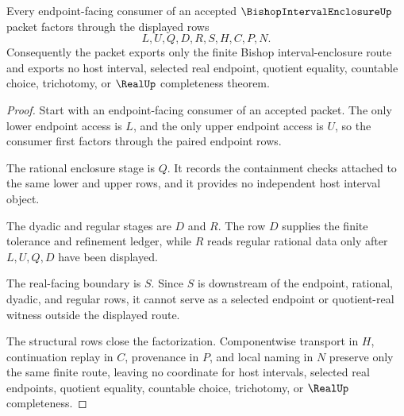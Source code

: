 \begin{theorem}
\label{thm:bishop-interval-enclosure-endpoint-nonescape}
Every endpoint-facing consumer of an accepted $\BishopIntervalEnclosureUp$ packet factors through the displayed rows
$$
L,U,Q,D,R,S,H,C,P,N .
$$
Consequently the packet exports only the finite Bishop interval-enclosure route and exports no host interval, selected real endpoint, quotient equality, countable choice, trichotomy, or $\RealUp$ completeness theorem.
\end{theorem}
\begin{proof}
Start with an endpoint-facing consumer of an accepted packet. The only lower endpoint access is $L$, and the only upper endpoint access is $U$, so the consumer first factors through the paired endpoint rows.

The rational enclosure stage is $Q$. It records the containment checks attached to the same lower and upper rows, and it provides no independent host interval object.

The dyadic and regular stages are $D$ and $R$. The row $D$ supplies the finite tolerance and refinement ledger, while $R$ reads regular rational data only after $L,U,Q,D$ have been displayed.

The real-facing boundary is $S$. Since $S$ is downstream of the endpoint, rational, dyadic, and regular rows, it cannot serve as a selected endpoint or quotient-real witness outside the displayed route.

The structural rows close the factorization. Componentwise transport in $H$, continuation replay in $C$, provenance in $P$, and local naming in $N$ preserve only the same finite route, leaving no coordinate for host intervals, selected real endpoints, quotient equality, countable choice, trichotomy, or $\RealUp$ completeness.
\end{proof}


